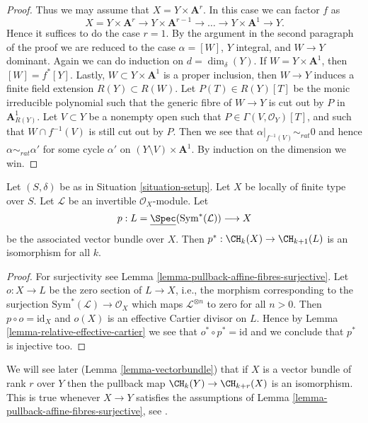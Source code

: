 \begin{proof}
\medskip\noindent
Thus we may assume that $X = Y \times \mathbf{A}^r$.
In this case we can factor $f$ as
$$
X = Y \times \mathbf{A}^r \to
Y \times \mathbf{A}^{r - 1} \to \ldots \to
Y \times \mathbf{A}^1 \to Y.
$$
Hence it suffices to do the case $r = 1$. By the argument in the
second paragraph of the proof we are reduced to the case
$\alpha = [W]$, $Y$ integral, and $W \to Y$ dominant.
Again we can do induction on $d = \dim_\delta(Y)$.
If $W = Y \times \mathbf{A}^1$, then $[W] = f^*[Y]$.
Lastly, $W \subset Y \times \mathbf{A}^1$ is a proper inclusion,
then $W \to Y$ induces a finite field extension $R(Y) \subset R(W)$.
Let $P(T) \in R(Y)[T]$ be the monic irreducible polynomial such
that the generic fibre of $W \to Y$ is cut out by $P$ in
$\mathbf{A}^1_{R(Y)}$. Let $V \subset Y$ be a nonempty open such
that $P \in \Gamma(V, \mathcal{O}_Y)[T]$, and such that
$W \cap f^{-1}(V)$ is still cut out by $P$. Then we see that
$\alpha|_{f^{-1}(V)} \sim_{rat} 0$ and hence $\alpha \sim_{rat} \alpha'$
for some cycle $\alpha'$ on $(Y \setminus V) \times \mathbf{A}^1$.
By induction on the dimension we win.
\end{proof}

\begin{lemma}
\label{lemma-linebundle}
Let $(S, \delta)$ be as in Situation \ref{situation-setup}.
Let $X$ be locally of finite type over $S$.
Let $\mathcal{L}$ be an invertible $\mathcal{O}_X$-module.
Let
$$
p :
L = \underline{\Spec}(\text{Sym}^*(\mathcal{L}))
\longrightarrow
X
$$
be the associated vector bundle over $X$.
Then $p^* : \CH_k(X) \to \CH_{k + 1}(L)$ is an isomorphism for all $k$.
\end{lemma}

\begin{proof}
For surjectivity see Lemma \ref{lemma-pullback-affine-fibres-surjective}.
Let $o : X \to L$ be the zero section of $L \to X$, i.e., the morphism
corresponding to the surjection $\text{Sym}^*(\mathcal{L}) \to \mathcal{O}_X$
which maps $\mathcal{L}^{\otimes n}$ to zero for all $n > 0$.
Then $p \circ o = \text{id}_X$ and $o(X)$ is an effective
Cartier divisor on $L$. Hence by Lemma \ref{lemma-relative-effective-cartier}
we see that $o^* \circ p^* = \text{id}$ and we conclude that $p^*$ is
injective too.
\end{proof}

\begin{remark}
\label{remark-when-isomorphism}
We will see later (Lemma \ref{lemma-vectorbundle}) that if $X$ is a
vector bundle of rank $r$ over $Y$ then the pullback map
$\CH_k(Y) \to \CH_{k + r}(X)$
is an isomorphism. This is true whenever $X \to Y$ satisfies
the assumptions of Lemma \ref{lemma-pullback-affine-fibres-surjective}, see
\cite[Lemma 2.2]{Totaro-group}.
\end{remark}

